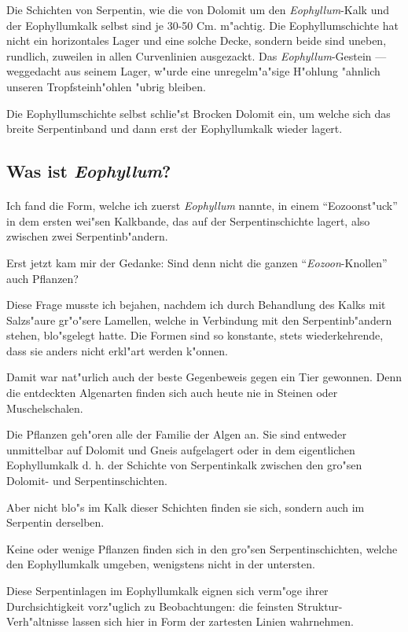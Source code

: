 \documentclass[a4paper, 11pt, oneside, german]{article}
\begin{document}
Die Schichten von Serpentin, wie die von Dolomit um den \emph{Eophyllum}-Kalk und der Eophyllumkalk selbst sind je 30-50 Cm. m"achtig. Die Eophyllumschichte hat nicht ein horizontales Lager und eine solche Decke, sondern beide sind uneben, rundlich, zuweilen in allen Curvenlinien ausgezackt. Das \emph{Eophyllum}-Gestein --- weggedacht aus seinem Lager, w"urde eine unregelm"a"sige H"ohlung "ahnlich unseren Tropfsteinh"ohlen "ubrig bleiben.

Die Eophyllumschichte selbst schlie"st Brocken Dolomit ein, um welche sich das breite Serpentinband und dann erst der Eophyllumkalk wieder lagert.
\clearpage
\subsection{Was ist \emph{Eophyllum}?}
\paragraph{}
Ich fand die Form, welche ich zuerst \emph{Eophyllum} nannte, in einem "`Eozoonst"uck"' in dem ersten wei"sen Kalkbande, das auf der Serpentinschichte lagert, also zwischen zwei Serpentinb"andern.

Erst jetzt kam mir der Gedanke: Sind denn nicht die ganzen "`\emph{Eozoon}-Knollen"' auch Pflanzen?

Diese Frage musste ich bejahen, nachdem ich durch Behandlung des Kalks mit Salzs"aure gr"o"sere Lamellen, welche in Verbindung mit den Serpentinb"andern stehen, blo"sgelegt hatte. Die Formen sind so konstante, stets wiederkehrende, dass sie anders nicht erkl"art werden k"onnen.

Damit war nat"urlich auch der beste Gegenbeweis gegen ein Tier gewonnen. Denn die entdeckten Algenarten finden sich auch heute nie in Steinen oder Muschelschalen.

Die Pflanzen geh"oren alle der Familie der Algen an. Sie sind entweder unmittelbar auf Dolomit und Gneis aufgelagert oder in dem eigentlichen Eophyllumkalk d. h. der Schichte von Serpentinkalk zwischen den gro"sen Dolomit- und Serpentinschichten.

Aber nicht blo"s im Kalk dieser Schichten finden sie sich, sondern auch im Serpentin derselben.

Keine oder wenige Pflanzen finden sich in den gro"sen Serpentinschichten, welche den Eophyllumkalk umgeben, wenigstens nicht in der untersten.

Diese Serpentinlagen im Eophyllumkalk eignen sich verm"oge ihrer Durchsichtigkeit vorz"uglich zu Beobachtungen: die feinsten Struktur-Verh"altnisse lassen sich hier in Form der zartesten Linien wahrnehmen.
\end{document}
